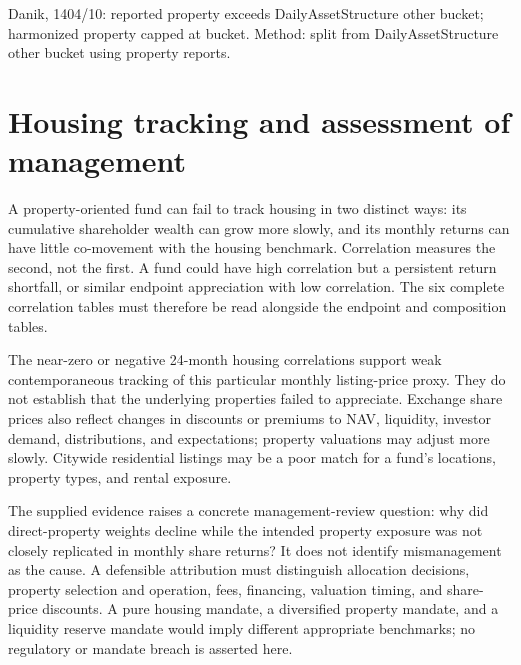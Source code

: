 \documentclass[11pt,a4paper]{article}
\begin{document}
Danik, 1404/10: reported property exceeds DailyAssetStructure other bucket; harmonized property capped at bucket. Method: split from DailyAssetStructure other bucket using property reports.

\section{Housing tracking and assessment of management}

A property-oriented fund can fail to track housing in two distinct ways: its cumulative shareholder wealth can grow more slowly, and its monthly returns can have little co-movement with the housing benchmark. Correlation measures the second, not the first. A fund could have high correlation but a persistent return shortfall, or similar endpoint appreciation with low correlation. The six complete correlation tables must therefore be read alongside the endpoint and composition tables.

The near-zero or negative 24-month housing correlations support weak contemporaneous tracking of this particular monthly listing-price proxy. They do not establish that the underlying properties failed to appreciate. Exchange share prices also reflect changes in discounts or premiums to NAV, liquidity, investor demand, distributions, and expectations; property valuations may adjust more slowly. Citywide residential listings may be a poor match for a fund's locations, property types, and rental exposure.

The supplied evidence raises a concrete management-review question: why did direct-property weights decline while the intended property exposure was not closely replicated in monthly share returns? It does not identify mismanagement as the cause. A defensible attribution must distinguish allocation decisions, property selection and operation, fees, financing, valuation timing, and share-price discounts. A pure housing mandate, a diversified property mandate, and a liquidity reserve mandate would imply different appropriate benchmarks; no regulatory or mandate breach is asserted here.

\begin{center}
\small
{}
\end{center}
\end{document}
